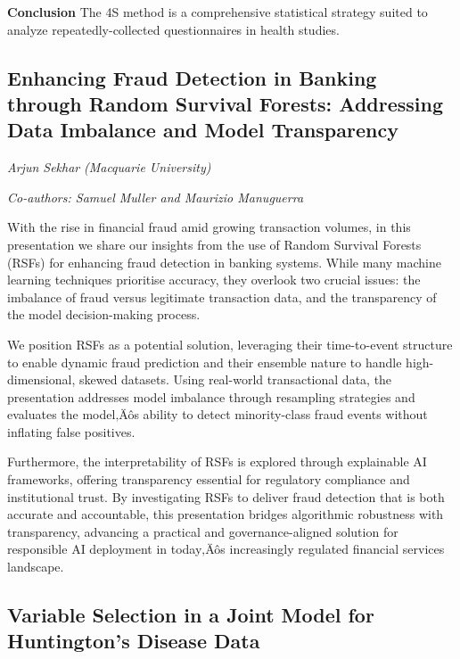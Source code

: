 \documentclass[
]{scrreprt}
\begin{document}
\textbf{Conclusion} The 4S method is a comprehensive statistical
strategy suited to analyze repeatedly-collected questionnaires in health
studies.

\subsection{Enhancing Fraud Detection in Banking through Random Survival
Forests: Addressing Data Imbalance and Model
Transparency}\label{enhancing-fraud-detection-in-banking-through-random-survival-forests-addressing-data-imbalance-and-model-transparency}

\emph{Arjun Sekhar} \emph{(Macquarie University)}

\emph{Co-authors: Samuel Muller and Maurizio Manuguerra}

\setlength{\parskip}{0.5em}

With the rise in financial fraud amid growing transaction volumes, in
this presentation we share our insights from the use of Random Survival
Forests (RSFs) for enhancing fraud detection in banking systems. While
many machine learning techniques prioritise accuracy, they overlook two
crucial issues: the imbalance of fraud versus legitimate transaction
data, and the transparency of the model decision-making process.

We position RSFs as a potential solution, leveraging their time-to-event
structure to enable dynamic fraud prediction and their ensemble nature
to handle high-dimensional, skewed datasets. Using real-world
transactional data, the presentation addresses model imbalance through
resampling strategies and evaluates the model‚Äôs ability to detect
minority-class fraud events without inflating false positives.

Furthermore, the interpretability of RSFs is explored through
explainable AI frameworks, offering transparency essential for
regulatory compliance and institutional trust. By investigating RSFs to
deliver fraud detection that is both accurate and accountable, this
presentation bridges algorithmic robustness with transparency, advancing
a practical and governance-aligned solution for responsible AI
deployment in today‚Äôs increasingly regulated financial services
landscape.

\subsection{Variable Selection in a Joint Model for Huntington's Disease
Data}\label{variable-selection-in-a-joint-model-for-huntingtons-disease-data}
\end{document}
